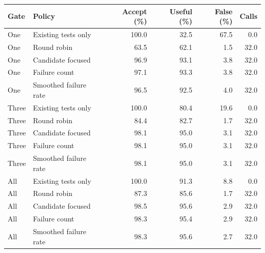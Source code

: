\begin{tabular}{llrrrr}\toprule
Gate & Policy & Accept (\%) & Useful (\%) & False (\%) & Calls\\\midrule
One & Existing tests only & 100.0 & 32.5 & 67.5 & 0.0\\
One & Round robin & 63.5 & 62.1 & 1.5 & 32.0\\
One & Candidate focused & 96.9 & 93.1 & 3.8 & 32.0\\
One & Failure count & 97.1 & 93.3 & 3.8 & 32.0\\
One & Smoothed failure rate & 96.5 & 92.5 & 4.0 & 32.0\\
\midrule
Three & Existing tests only & 100.0 & 80.4 & 19.6 & 0.0\\
Three & Round robin & 84.4 & 82.7 & 1.7 & 32.0\\
Three & Candidate focused & 98.1 & 95.0 & 3.1 & 32.0\\
Three & Failure count & 98.1 & 95.0 & 3.1 & 32.0\\
Three & Smoothed failure rate & 98.1 & 95.0 & 3.1 & 32.0\\
\midrule
All & Existing tests only & 100.0 & 91.3 & 8.8 & 0.0\\
All & Round robin & 87.3 & 85.6 & 1.7 & 32.0\\
All & Candidate focused & 98.5 & 95.6 & 2.9 & 32.0\\
All & Failure count & 98.3 & 95.4 & 2.9 & 32.0\\
All & Smoothed failure rate & 98.3 & 95.6 & 2.7 & 32.0\\
\bottomrule\end{tabular}
